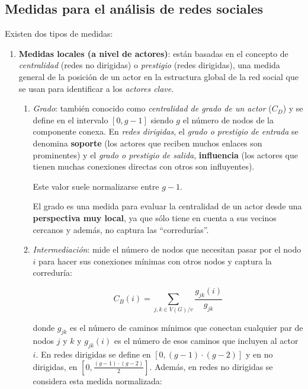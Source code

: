 \documentclass[10pt,spanish, landscape, twocolumn]{article}
\begin{document}
\subsection{\textcolor{tematres}Medidas para el análisis de redes sociales}
Existen dos tipos de medidas:
\begin{enumerate}[\color{tematres}{$\star$}]
    \item \textbf{\textcolor{tematres}{Medidas locales (a nivel de actores)}}: están basadas en el concepto de \textit{\textcolor{tematres}{centralidad}} (redes no dirigidas) o \textit{\textcolor{tematres}{prestigio}} (redes dirigidas), una medida general de la posición de un actor en la estructura global de la red social que se usan para identificar a los \textit{\textcolor{tematres}{actores clave}}.
    \begin{enumerate}[---]
        \item \textit{\textcolor{tematres}{Grado}}: también conocido como \textit{\textcolor{tematres}{centralidad de grado de un actor}} ($C_D$) y se define en el intervalo $[0, g-1]$ siendo $g$ el número de nodos de la componente conexa. En \textit{\textcolor{tematres}{redes dirigidas}}, el \textit{\textcolor{tematres}{grado o prestigio de entrada}} se denomina \textbf{\textcolor{tematres}{soporte}} (los actores que reciben muchos enlaces son prominentes) y el \textit{\textcolor{tematres}{grado o prestigio de salida}}, \textbf{\textcolor{tematres}{influencia}} (los actores que tienen muchas conexiones directas con otros son influyentes).

        Este valor suele normalizarse entre $g-1$.

        El grado es una medida para evaluar la centralidad de un actor desde una \textbf{\textcolor{tematres}{perspectiva muy local}}, ya que sólo tiene en cuenta a sus vecinos cercanos y además, no captura las ``corredurías''.

        \item \textit{\textcolor{tematres}{Intermediación}}: mide el número de nodos que necesitan pasar por el nodo $i$ para hacer sus conexiones mínimas con otros nodos y captura la correduría:

        \begin{displaymath}
            C_B (i) = \sum_{j,k \in V (G)/v} \frac{g_{jk} (i)}{g_{jk}}
        \end{displaymath}

        donde $g_{jk}$ es el número de caminos mínimos que conectan cualquier par de nodos $j$ y $k$ y $g_{jk} (i)$ es el número de esos caminos que incluyen al actor $i$. En redes dirigidas se define en $[0, (g-1)\cdot(g-2)]$ y en no dirigidas, en $[0, \frac{(g-1)\cdot(g-2)}{2}]$. Además, en redes no dirigidas se considera esta medida normalizada:


\end{enumerate}
\end{enumerate}
\end{document}
